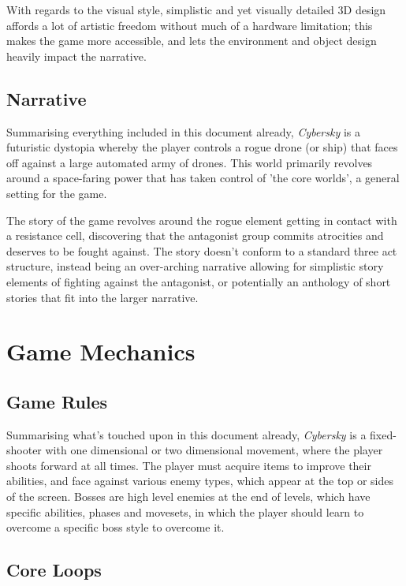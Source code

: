 \documentclass{scrartcl}
\begin{document}
With regards to the visual style, simplistic and yet visually detailed 3D design affords a lot of artistic freedom without much of a hardware limitation; this makes the game more accessible, and lets the environment and object design heavily impact the narrative.

\subsection{Narrative}

Summarising everything included in this document already, \emph{Cybersky} is a futuristic dystopia whereby the player controls a rogue drone (or ship) that faces off against a large automated army of drones. This world primarily revolves around a space-faring power that has taken control of 'the core worlds', a general setting for the game.

The story of the game revolves around the rogue element getting in contact with a resistance cell, discovering that the antagonist group commits atrocities and deserves to be fought against. The story doesn't conform to a standard three act structure, instead being an over-arching narrative allowing for simplistic story elements of fighting against the antagonist, or potentially an anthology of short stories that fit into the larger narrative.

\section{
  Game Mechanics
 }

\subsection{Game Rules}

Summarising what's touched upon in this document already, \emph{Cybersky} is a fixed-shooter with one dimensional or two dimensional movement, where the player shoots forward at all times. The player must acquire items to improve their abilities, and face against various enemy types, which appear at the top or sides of the screen. Bosses are high level enemies at the end of levels, which have specific abilities, phases and movesets, in which the player should learn to overcome a specific boss style to overcome it.

\subsection{Core Loops}
\end{document}
